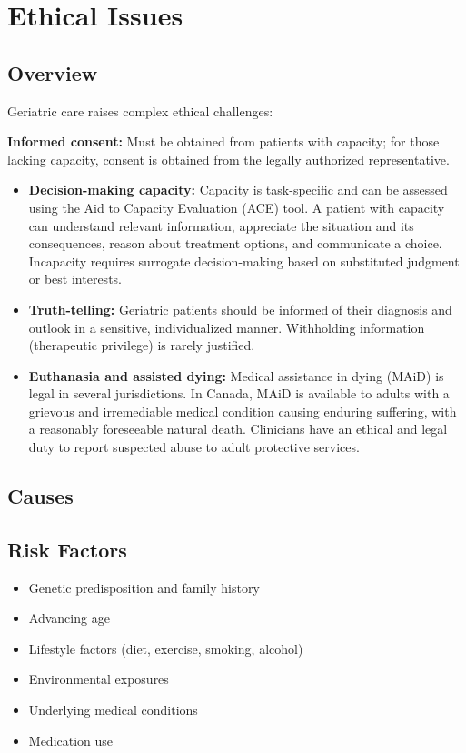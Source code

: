\chapter{Ethical Issues}
\label{sec:Ethical Issues}

\section{Overview}
Geriatric care raises complex ethical challenges:

\textbf{Informed consent:} Must be obtained from patients with capacity; for those lacking capacity, consent is obtained from the legally authorized representative.

\begin{itemize}[noitemsep]
  \item \textbf{Decision-making capacity:} Capacity is task-specific and can be assessed using the Aid to Capacity Evaluation (ACE) tool. A patient with capacity can understand relevant information, appreciate the situation and its consequences, reason about treatment options, and communicate a choice. Incapacity requires surrogate decision-making based on substituted judgment or best interests.
  \item \textbf{Truth-telling:} Geriatric patients should be informed of their diagnosis and outlook in a sensitive, individualized manner. Withholding information (therapeutic privilege) is rarely justified.
  \item \textbf{Euthanasia and assisted dying:} Medical assistance in dying (MAiD) is legal in several jurisdictions. In Canada, MAiD is available to adults with a grievous and irremediable medical condition causing enduring suffering, with a reasonably foreseeable natural death. Clinicians have an ethical and legal duty to report suspected abuse to adult protective services.
\end{itemize}
\section{Causes}
\section{Risk Factors}

\begin{itemize}[noitemsep]
  \item Genetic predisposition and family history
  \item Advancing age
  \item Lifestyle factors (diet, exercise, smoking, alcohol)
  \item Environmental exposures
  \item Underlying medical conditions
  \item Medication use
\end{itemize}
